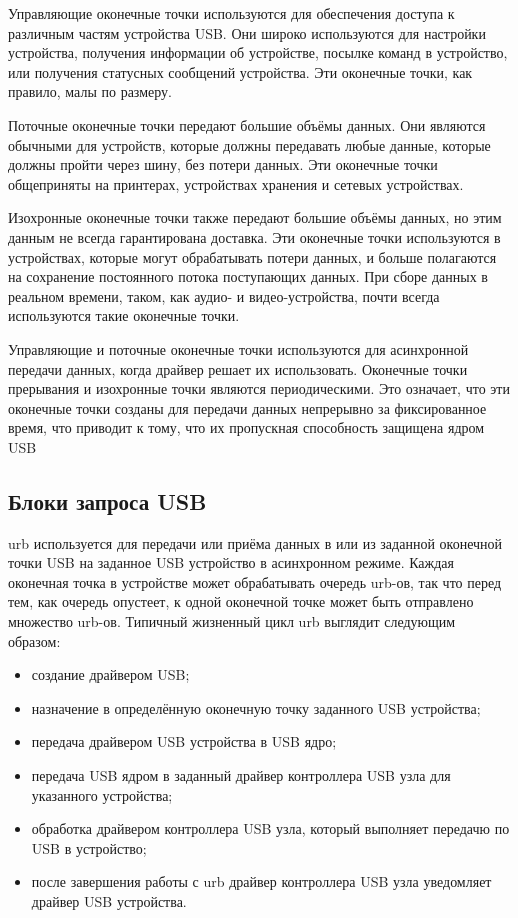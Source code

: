 Управляющие оконечные точки используются для обеспечения доступа к различным
частям устройства USB. Они широко используются для настройки устройства, получения
информации об устройстве, посылке команд в устройство, или получения статусных
сообщений устройства. Эти оконечные точки, как правило, малы по размеру.\par

Поточные оконечные точки передают большие объёмы данных. Они являются обычными для устройств, которые должны
передавать любые данные, которые должны пройти через шину, без потери данных.
Эти оконечные точки общеприняты на принтерах,
устройствах хранения и сетевых устройствах.\par

Изохронные оконечные точки также передают большие объёмы данных, но этим данным
не всегда гарантирована доставка. Эти оконечные точки используются в устройствах,
которые могут обрабатывать потери данных, и больше полагаются на сохранение
постоянного потока поступающих данных. При сборе данных в реальном времени, таком,
как аудио- и видео-устройства, почти всегда используются такие оконечные точки.
\par

Управляющие и поточные оконечные точки используются для асинхронной передачи
данных, когда драйвер решает их использовать. Оконечные точки прерывания и изохронные
точки являются периодическими. Это означает, что эти оконечные точки созданы для
передачи данных непрерывно за фиксированное время, что приводит к тому, что их пропускная
способность защищена ядром USB


\subsection{Блоки запроса USB}
urb используется для передачи или приёма данных в или из заданной оконечной точки USB
на заданное USB устройство в асинхронном режиме. Каждая оконечная точка в
устройстве может обрабатывать очередь urb-ов, так что перед тем, как очередь опустеет, к
одной оконечной точке может быть отправлено множество urb-ов. Типичный жизненный цикл
urb выглядит следующим образом:
\begin{itemize}
	\item создание драйвером USB;
	\item назначение в определённую оконечную точку заданного USB устройства;
	\item передача драйвером USB устройства в USB ядро;
	\item передача USB ядром в заданный драйвер контроллера USB узла для указанного
	устройства;
	\item обработка драйвером контроллера USB узла, который выполняет передачю по USB в
	устройство;
	\item после завершения работы с urb драйвер контроллера USB узла уведомляет драйвер USB
	устройства.
\end{itemize}


\pagebreak

